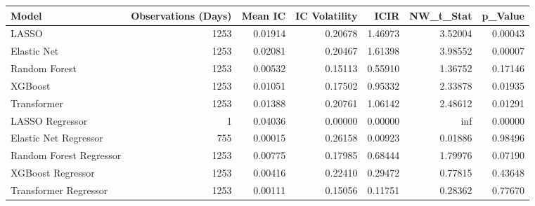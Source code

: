 \begin{tabular}{lrrrrrr}
\toprule
Model & Observations (Days) & Mean IC & IC Volatility & ICIR & NW_t_Stat & p_Value \\
\midrule
LASSO & 1253 & 0.01914 & 0.20678 & 1.46973 & 3.52004 & 0.00043 \\
Elastic Net & 1253 & 0.02081 & 0.20467 & 1.61398 & 3.98552 & 0.00007 \\
Random Forest & 1253 & 0.00532 & 0.15113 & 0.55910 & 1.36752 & 0.17146 \\
XGBoost & 1253 & 0.01051 & 0.17502 & 0.95332 & 2.33878 & 0.01935 \\
Transformer & 1253 & 0.01388 & 0.20761 & 1.06142 & 2.48612 & 0.01291 \\
LASSO Regressor & 1 & 0.04036 & 0.00000 & 0.00000 & inf & 0.00000 \\
Elastic Net Regressor & 755 & 0.00015 & 0.26158 & 0.00923 & 0.01886 & 0.98496 \\
Random Forest Regressor & 1253 & 0.00775 & 0.17985 & 0.68444 & 1.79976 & 0.07190 \\
XGBoost Regressor & 1253 & 0.00416 & 0.22410 & 0.29472 & 0.77815 & 0.43648 \\
Transformer Regressor & 1253 & 0.00111 & 0.15056 & 0.11751 & 0.28362 & 0.77670 \\
\bottomrule
\end{tabular}

